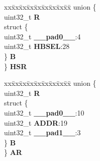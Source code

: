 \begin{DoxyCompactItemize}
\begin{tabbing}
\end{tabbing}\item 
\mbox{\label{structFLASH__tag_a5bec213d83ecd4d792d344e5788b24ac}} 
\begin{tabbing}
xx\=xx\=xx\=xx\=xx\=xx\=xx\=xx\=xx\=\kill
union \{\\
\>uint32\_t {\bfseries R}\\
\>struct \{\\
\>\>uint32\_t {\bfseries \_\_pad0\_\_}:4\\
\>\>uint32\_t {\bfseries HBSEL}:28\\
\>\} {\bfseries B}\\
\} {\bfseries HSR}\\

\end{tabbing}\item 
\mbox{\label{structFLASH__tag_a4f03c0c9fde6d68c24cc48a672055869}} 
\begin{tabbing}
xx\=xx\=xx\=xx\=xx\=xx\=xx\=xx\=xx\=\kill
union \{\\
\>uint32\_t {\bfseries R}\\
\>struct \{\\
\>\>uint32\_t {\bfseries \_\_pad0\_\_}:10\\
\>\>uint32\_t {\bfseries ADDR}:19\\
\>\>uint32\_t {\bfseries \_\_pad1\_\_}:3\\
\>\} {\bfseries B}\\
\} {\bfseries AR}\\


\end{tabbing}
\end{DoxyCompactItemize}
